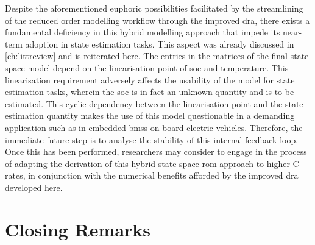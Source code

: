 Despite   the  aforementioned   euphoric   possibilities   facilitated  by   the
streamlining  of  the reduced  order  modelling  workflow through  the  improved
\gls{dra},  there  exists a  fundamental  deficiency  in this  hybrid  modelling
approach  that impede  its near-term  adoption in  state estimation  tasks. This
aspect was already discussed in \cref{ch:littreview} and is reiterated here. The
entries  in  the  matrices  of  the  final  state  space  model  depend  on  the
linearisation point of \gls{soc} and temperature. This linearisation requirement
adversely affects the usability of the model for state estimation tasks, wherein
the \gls{soc} is in fact an unknown quantity and is to be estimated. This cyclic
dependency  between the  linearisation point  and the  state-estimation quantity
makes the use of  this model questionable in a demanding  application such as in
embedded \glspl{bms} on-board electric vehicles. Therefore, the immediate future
step is to analyse  the stability of this internal feedback  loop. Once this has
been performed,  researchers may consider to  engage in the process  of adapting
the derivation of this hybrid  state-space \gls{rom} approach to higher C-rates,
in conjunction  with the numerical  benefits afforded by the  improved \gls{dra}
developed here.

\section{Closing Remarks}








